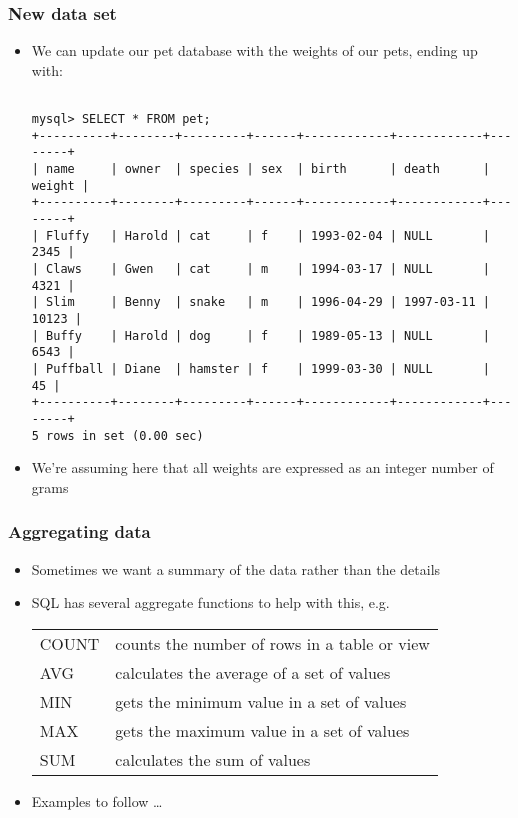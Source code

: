 \documentclass[hyperref={pdfpagelabels=false},svgnames,xcolor=table]{beamer}
\begin{document}
\begin{frame}[shrink=10,fragile]
  \frametitle{New data set}
  \begin{itemize}
    \item We can update our pet database with the weights of our pets,
      ending up with:
      \begin{scriptsize}
\begin{verbatim}

mysql> SELECT * FROM pet;
+----------+--------+---------+------+------------+------------+--------+
| name     | owner  | species | sex  | birth      | death      | weight |
+----------+--------+---------+------+------------+------------+--------+
| Fluffy   | Harold | cat     | f    | 1993-02-04 | NULL       |   2345 |
| Claws    | Gwen   | cat     | m    | 1994-03-17 | NULL       |   4321 |
| Slim     | Benny  | snake   | m    | 1996-04-29 | 1997-03-11 |  10123 |
| Buffy    | Harold | dog     | f    | 1989-05-13 | NULL       |   6543 |
| Puffball | Diane  | hamster | f    | 1999-03-30 | NULL       |     45 |
+----------+--------+---------+------+------------+------------+--------+
5 rows in set (0.00 sec)

\end{verbatim}
      \end{scriptsize}
    \item We're assuming here that all weights are expressed as an integer 
      number of grams
  \end{itemize}
\end{frame}

\begin{frame}
  \frametitle{Aggregating data}
  \begin{itemize}
    \item Sometimes we want a summary of the data rather than the details 
    \item SQL has several aggregate functions to help with this, e.g. \\
      \begin{tabular}{>{\color{blue}}lp{}}
        COUNT & counts the number of rows in a table or view \\
        AVG & calculates the average of a set of values \\
        MIN & gets the minimum value in a set of values \\
        MAX & gets the maximum value in a set of values \\
        SUM & calculates the sum of values
      \end{tabular}
    \item Examples to follow \ldots
  \end{itemize}
\end{frame}
\end{document}
